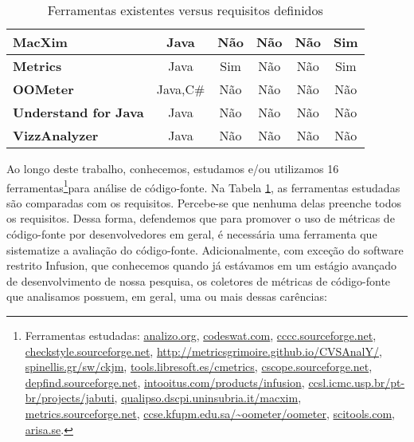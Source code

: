 \begin{table}[hbt]
\begin{center}
\begin{tabular}{|l|c|c|c|c|c|}
  \textbf{MacXim}            & Java                & Não                 & Não             & Não             & Sim \\
  \hline

  \textbf{Metrics}           & Java                & Sim                 & Não             & Não             & Sim \\
  \hline

  \textbf{OOMeter}           & Java,C\#            & Não                 & Não             & Não             & Não \\
  \hline

\textbf{Understand for Java} & Java                & Não                 & Não             & Não             & Não \\
  \hline

\textbf{VizzAnalyzer}        & Java                & Não                 & Não             & Não             & Não \\
  \hline

\end{tabular}
\caption{Ferramentas existentes versus requisitos definidos}
\label{tab:ferramentas}
\end{center}
\end{table}


Ao longo deste trabalho, conhecemos, estudamos e/ou utilizamos 16
ferramentas\footnote{Ferramentas estudadas:
\url{analizo.org},
\url{codeswat.com},
\url{cccc.sourceforge.net},
\url{checkstyle.sourceforge.net},
\url{http://metricsgrimoire.github.io/CVSAnalY/},
\url{spinellis.gr/sw/ckjm},
\url{tools.libresoft.es/cmetrics},
\url{cscope.sourceforge.net},
\url{depfind.sourceforge.net},
\url{intooitus.com/products/infusion},
\url{ccsl.icmc.usp.br/pt-br/projects/jabuti},
\url{qualipso.dscpi.uninsubria.it/macxim},
\url{metrics.sourceforge.net},
\url{ccse.kfupm.edu.sa/~oometer/oometer},
\url{scitools.com},
\url{arisa.se}.
}para análise de código-fonte.
%
Na Tabela \ref{tab:ferramentas}, as ferramentas estudadas são comparadas com
os requisitos. Percebe-se que nenhuma delas preenche todos os requisitos.
%
Dessa forma, defendemos que para promover o uso de métricas de código-fonte por
desenvolvedores em geral, é necessária uma ferramenta que sistematize a
avaliação do código-fonte.
%
Adicionalmente, com exceção do software restrito Infusion, que conhecemos quando
já estávamos em um estágio avançado de desenvolvimento de nossa pesquisa, os coletores
de métricas de código-fonte que analisamos possuem, em geral, uma ou mais
dessas carências:

